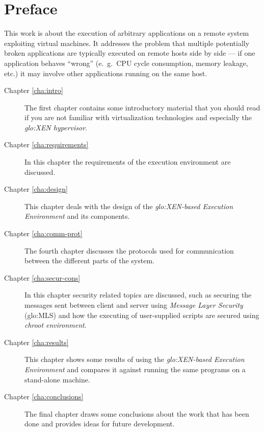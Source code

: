 
\chapter{Preface}
\thispagestyle{empty}

This work  is about  the execution of  arbitrary applications on  a remote
system exploiting virtual machines. It addresses the problem that multiple
potentially  broken applications  are typically  executed on  remote hosts
side by  side ---  if one application  behaves ``wrong''  (e.~g.~CPU cycle
consumption,  memory  leakage, etc.)  it  may  involve other  applications
running on the same host.

\vfill

\begin{description}
\item[Chapter   \ref{cha:intro}]   The   first   chapter   contains   some
  introductory material that you should  read if you are not familiar with
  virtualization  technologies   and  especially  the  \emph{\gls{glo:XEN}
    hypervisor}.
  
\item[Chapter \ref{cha:requirements}] In  this chapter the requirements of
  the execution environment are discussed.
  
\item[Chapter \ref{cha:design}] This chapter  deals with the design of the
  \emph{\gls{glo:XEN}-based Execution Environment} and its components.
  
\item[Chapter  \ref{cha:comm-prot}]  The   fourth  chapter  discusses  the
  protocols  used for  communication between  the different  parts  of the
  system.
  
\item[Chapter  \ref{cha:secur-cons}]  In  this  chapter  security  related
  topics are discussed, such as  securing the messages sent between client
  and server  using \emph{Message Layer Security}  (\gls{glo:MLS}) and how
  the executing  of user-supplied  scripts are secured  using \emph{chroot
    environment}.
  
\item[Chapter \ref{cha:results}] This chapter  shows some results of using
  the  \emph{\gls{glo:XEN}-based Execution  Environment}  and compares  it
  against running the same programs on a stand-alone machine.
  
\item[Chapter   \ref{cha:conclusions}]  The   final  chapter   draws  some
  conclusions about  the work  that has been  done and provides  ideas for
  future development.
  
\end{description}

\clearpage

